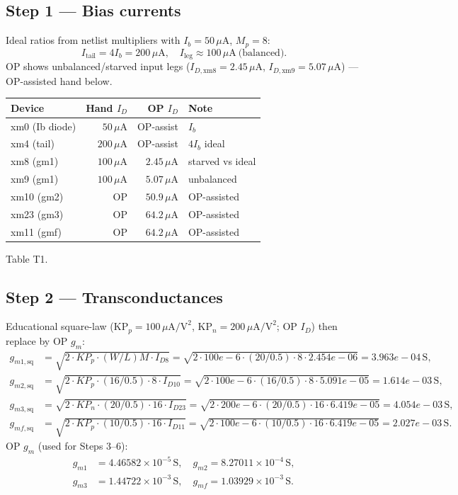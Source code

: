 \documentclass[11pt]{article}
\begin{document}
\subsection{Step 1 --- Bias currents}
Ideal ratios from netlist multipliers with \(I_b=50\,\mu\mathrm{A}\), \(M_p=8\):
\[
I_{\mathrm{tail}}=4 I_b=200\,\mu\mathrm{A},\quad
I_{\mathrm{leg}}\approx 100\,\mu\mathrm{A}\ \text{(balanced)}.
\]
OP shows unbalanced/starved input legs (\(I_{D,\mathrm{xm8}}=2.45\,\mu\mathrm{A}\), \(I_{D,\mathrm{xm9}}=5.07\,\mu\mathrm{A}\)) --- OP-assisted hand below.

\begin{center}
\begin{tabular}{lrrl}
\toprule
Device & Hand \(I_D\) & OP \(I_D\) & Note \\
\midrule
xm0 (Ib diode) & \(50\,\mu\mathrm{A}\) & OP-assist & \(I_b\) \\
xm4 (tail) & \(200\,\mu\mathrm{A}\) & OP-assist & \(4 I_b\) ideal \\
xm8 (gm1) & \(100\,\mu\mathrm{A}\) & \(2.45\,\mu\mathrm{A}\) & starved vs ideal \\
xm9 (gm1) & \(100\,\mu\mathrm{A}\) & \(5.07\,\mu\mathrm{A}\) & unbalanced \\
xm10 (gm2) & OP & \(50.9\,\mu\mathrm{A}\) & OP-assisted \\
xm23 (gm3) & OP & \(64.2\,\mu\mathrm{A}\) & OP-assisted \\
xm11 (gmf) & OP & \(64.2\,\mu\mathrm{A}\) & OP-assisted \\
\bottomrule
\end{tabular}
\end{center}
\footnotesize Table T1.

\subsection{Step 2 --- Transconductances}
Educational square-law (KP\(_p=100\,\mu\mathrm{A/V}^2\), KP\(_n=200\,\mu\mathrm{A/V}^2\); OP \(I_D\)) then replace by OP \(g_m\):
\begin{align*}
g_{m1,\mathrm{sq}}&=\sqrt{2\cdot KP_p\cdot(W/L)M\cdot I_{D8}}=\sqrt{2\cdot 100e-6\cdot(20/0.5)\cdot 8\cdot 2.454e-06}=3.963e-04\,\mathrm{S},\\
g_{m2,\mathrm{sq}}&=\sqrt{2\cdot KP_p\cdot(16/0.5)\cdot 8\cdot I_{D10}}=\sqrt{2\cdot 100e-6\cdot(16/0.5)\cdot 8\cdot 5.091e-05}=1.614e-03\,\mathrm{S},\\
g_{m3,\mathrm{sq}}&=\sqrt{2\cdot KP_n\cdot(20/0.5)\cdot 16\cdot I_{D23}}=\sqrt{2\cdot 200e-6\cdot(20/0.5)\cdot 16\cdot 6.419e-05}=4.054e-03\,\mathrm{S},\\
g_{mf,\mathrm{sq}}&=\sqrt{2\cdot KP_p\cdot(10/0.5)\cdot 16\cdot I_{D11}}=\sqrt{2\cdot 100e-6\cdot(10/0.5)\cdot 16\cdot 6.419e-05}=2.027e-03\,\mathrm{S}.
\end{align*}
OP \(g_m\) (used for Steps 3--6):
\begin{align*}
g_{m1}&=4.46582\times10^{-5}\,\mathrm{S},\quad g_{m2}=8.27011\times10^{-4}\,\mathrm{S},\\
g_{m3}&=1.44722\times10^{-3}\,\mathrm{S},\quad g_{mf}=1.03929\times10^{-3}\,\mathrm{S}.
\end{align*}
\end{document}
